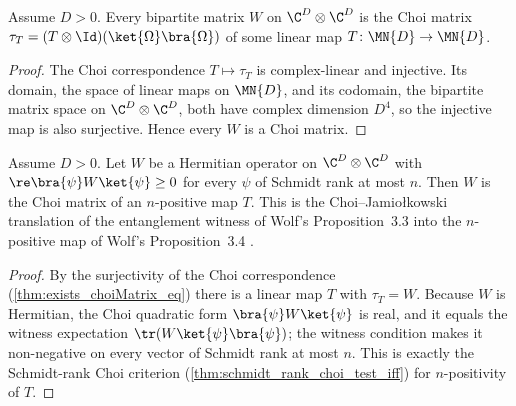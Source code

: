 \begin{theorem}
    \label{thm:exists_choiMatrix_eq}
    \leanok
    Assume $D>0$. Every bipartite matrix $W$ on $\C^D\otimes\C^D$ is the Choi matrix
    $\tau_T=(T\otimes\Id)(\ket{\Omega}\bra{\Omega})$ of some linear map
    $T\colon\MN{D}\to\MN{D}$.
\end{theorem}

\begin{proof}
    \leanok
    The Choi correspondence $T\mapsto\tau_T$ is complex-linear and injective. Its domain,
    the space of linear maps on $\MN{D}$, and its codomain, the bipartite matrix space on
    $\C^D\otimes\C^D$, both have complex dimension $D^4$, so the injective map is also
    surjective. Hence every $W$ is a Choi matrix.
\end{proof}

\begin{theorem}
    \label{thm:exists_isNPositiveMap_choiMatrix_eq}
    \leanok
    Assume $D>0$. Let $W$ be a Hermitian operator on $\C^D\otimes\C^D$ with
    $\re\bra{\psi}W\ket{\psi}\ge 0$ for every $\psi$ of Schmidt rank at most $n$.
    Then $W$ is the Choi matrix of an $n$-positive map $T$. This is the
    Choi--Jamio\l kowski translation of the entanglement witness of Wolf's Proposition~3.3
    into the $n$-positive map of Wolf's Proposition~3.4
    \cite[Chapter~3, Proposition~3.4]{Wolf2012Quantum}.
\end{theorem}

\begin{proof}
    \leanok
    By the surjectivity of the Choi correspondence (\ref{thm:exists_choiMatrix_eq}) there
    is a linear map $T$ with $\tau_T=W$. Because $W$ is Hermitian, the Choi quadratic form
    $\bra{\psi}W\ket{\psi}$ is real, and it equals the witness expectation
    $\tr(W\ket{\psi}\bra{\psi})$; the witness condition makes it non-negative on every
    vector of Schmidt rank at most $n$. This is exactly the Schmidt-rank Choi criterion
    (\ref{thm:schmidt_rank_choi_test_iff}) for $n$-positivity of $T$.
\end{proof}

